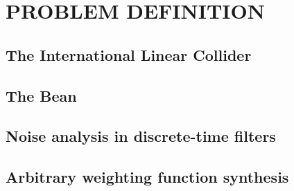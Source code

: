 \chapter{PROBLEM DEFINITION}
\label{chapter:problem}
\section{The International Linear Collider}
\section{The Bean}
\section{Noise analysis in discrete-time filters}
\section{Arbitrary weighting function synthesis}